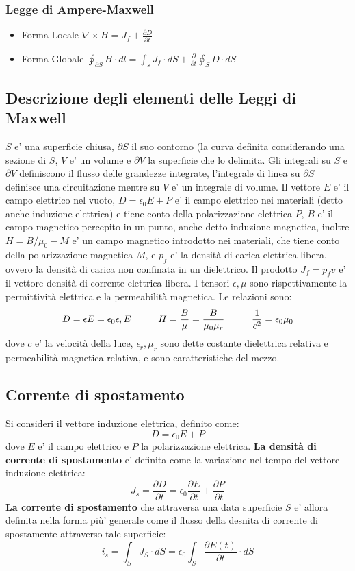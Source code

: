 \documentclass[a4paper, 10pt]{article}
\begin{document}
			\subsubsection{Legge di Ampere-Maxwell}
				\begin{itemize}
					\item Forma Locale $\nabla \times H = J_f + \frac{\partial D}{\partial t}$
					\item Forma Globale $\oint_{\partial S} H \cdot dl = \int_s J_f \cdot dS + \frac{\partial}{\partial t} \oint_S
										D \cdot dS $
				\end{itemize}
		\subsection*{Descrizione degli elementi delle Leggi di Maxwell}
		$S$ e' una superficie chiusa, $\partial S$ il suo contorno (la curva definita considerando una sezione di $S$, $V$ e' un
		volume e $\partial V$ la superficie che lo delimita. Gli integrali su $S$ e $\partial V$ definiscono il flusso delle 
		grandezze integrate, l'integrale di linea su $\partial S$ definisce una circuitazione mentre su $V$ e' un integrale 
		di volume. Il vettore $E$ e' il campo elettrico nel vuoto, $D = \epsilon_0 E + P$ e' il campo elettrico nei materiali
		(detto anche induzione elettrica) e tiene conto della polarizzazione elettrica $P$, $B$ e' il campo magnetico percepito in
		un punto, anche detto induzione magnetica, inoltre $H = B / \mu_0 - M$ e' un campo magnetico introdotto nei materiali, che
		tiene conto della polarizzazione magnetica $M$, e $p_f$ e' la densità di carica elettrica libera, ovvero la 
		densità di carica non confinata in un dielettrico. Il prodotto $J_f = p_f v$ e' il vettore densità di corrente elettrica 
		libera. I tensori $\epsilon, \mu$ sono rispettivamente la permittività elettrica e la permeabilità magnetica.
		Le relazioni sono:
		\[ D = \epsilon E = \epsilon_0 \epsilon_r E \hspace{1.0cm} H = \frac{B}{\mu} = \frac{B}{\mu_0 \mu_r} \hspace{1.0cm}
		\frac{1}{c^2} = \epsilon_0 \mu_0 \]
		dove $c$ e' la velocità della luce, $\epsilon_r, \mu_r$ sono dette costante dielettrica relativa e permeabilità magnetica
		relativa, e sono caratteristiche del mezzo.
		
		\subsection{Corrente di spostamento}
			Si consideri il vettore induzione elettrica, definito come:
			\[ D = \epsilon_0 E + P \] dove $E$ e' il campo elettrico e $P$ la polarizzazione elettrica. 
			\textbf{La densità di corrente di spostamento} e' definita come la variazione nel tempo del vettore induzione elettrica:
			\[ J_s = \frac{\partial D}{\partial t} = \epsilon_0 \frac{\partial E}{\partial t} + \frac{\partial P}{\partial t} \]
			\textbf{La corrente di spostamento} che attraversa una data superficie $S$ e' allora definita nella forma più' generale
			come il flusso della desnita di corrente di spostamente attraverso tale superficie:
			\[ i_s = \int_S J_S \cdot dS = \epsilon_0 \int_S \frac{\partial E(t)}{\partial t} \cdot dS \]
\end{document}
